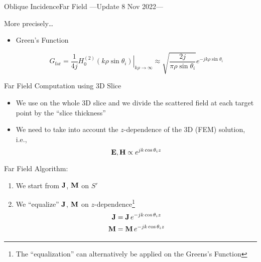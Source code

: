 \begin{frame}[allowframebreaks]{Oblique Incidence}{Far Field
    ---{Update 8 Nov 2022}---}
  \begin{block}{More precisely\ldots}
    \begin{itemize}
    \item Green's Function 

      \begin{equation*}
        G_\text{far} = \dfrac{1}{4j}
        \left.
          H_0^{(2)}\left( k\rho\sin\theta_i\right)
        \right|_{k\rho\rightarrow\infty} \approx
          \sqrt{\dfrac{2j}{\pi\rho\sin\theta_i}}
        e^{-j k \rho \sin\theta_i}
      \end{equation*}
      
    \end{itemize}

  \end{block}

  \framebreak %
  
  \begin{block}{Far Field Computation using 3D Slice}
    \begin{itemize}
    \item We use {\GreenD} on the whole 3D slice and we divide the
      scattered field at each target point by the ``slice thickness''
      
    \item We need to take into account the $z$-dependence of the
      3D (FEM) solution, i.e.,
      \begin{equation*}
        \mathbf{E},\mathbf{H} \propto   e^{j k \cos\theta_i z}
      \end{equation*}
      
    \end{itemize}

  \end{block}
  
  \framebreak %
  
  \begin{block}{Far Field Algorithm:}
  \end{block}
  
    \begin{enumerate}
    \item We start from $\mathbf{J}$, $\mathbf{M}$ on $S'$

    \item We ``equalize'' $\mathbf{J}$, $\mathbf{M}$ on $z$-dependence\footnote{The
        ``equalization'' can alternatively be applied on the Greens's
        Function}
       \begin{align*}
         \mathbf{J} &= \mathbf{J} \, e^{-j k \cos\theta_i z} \\
         \mathbf{M} &= \mathbf{M} \, e^{-j k \cos\theta_i z} 
       \end{align*}


\end{enumerate}
\end{frame}
